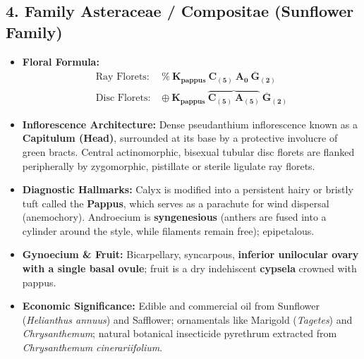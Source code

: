 \documentclass[10pt,twoside,openright]{book}
\begin{document}
\subsection{4. Family Asteraceae / Compositae (Sunflower Family)}
\begin{itemize}
  \item \textbf{Floral Formula:} 
  \begin{align*}
    \text{Ray Florets: } & \mathbf{\%\:\text{K}_{\text{pappus}}\:\text{C}_{(5)}\:\text{A}_0\:\overline{\text{G}}_{(2)}} \\
    \text{Disc Florets: } & \mathbf{\oplus\:\text{K}_{\text{pappus}}\:\overbrace{\text{C}_{(5)}\:\text{A}_{(5)}}\:\overline{\text{G}}_{(2)}}
  \end{align*}
  \item \textbf{Inflorescence Architecture:} Dense pseudanthium inflorescence known as a \textbf{Capitulum (Head)}, surrounded at its base by a protective involucre of green bracts. Central actinomorphic, bisexual tubular disc florets are flanked peripherally by zygomorphic, pistillate or sterile ligulate ray florets.
  \item \textbf{Diagnostic Hallmarks:} Calyx is modified into a persistent hairy or bristly tuft called the \textbf{Pappus}, which serves as a parachute for wind dispersal (anemochory). Androecium is \textbf{syngenesious} (anthers are fused into a cylinder around the style, while filaments remain free); epipetalous.
  \item \textbf{Gynoecium \& Fruit:} Bicarpellary, syncarpous, \textbf{inferior unilocular ovary with a single basal ovule}; fruit is a dry indehiscent \textbf{cypsela} crowned with pappus.
  \item \textbf{Economic Significance:} Edible and commercial oil from Sunflower (\textit{Helianthus annuus}) and Safflower; ornamentals like Marigold (\textit{Tagetes}) and \textit{Chrysanthemum}; natural botanical insecticide pyrethrum extracted from \textit{Chrysanthemum cinerariifolium}.
\end{itemize}
\end{document}
